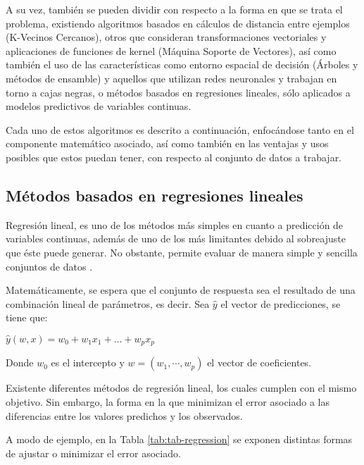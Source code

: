 A su vez, también se pueden dividir con respecto a la forma en que se trata el problema, existiendo algoritmos basados en cálculos de distancia entre ejemplos (K-Vecinos Cercanos), otros que consideran transformaciones vectoriales y aplicaciones de funciones de kernel (Máquina Soporte de Vectores), así como también el uso de las características como entorno espacial de decisión (Árboles y métodos de ensamble) y aquellos que utilizan redes neuronales y trabajan en torno a cajas negras, o métodos basados en regresiones lineales, sólo aplicados a modelos predictivos de variables continuas.

Cada uno de estos algoritmos es descrito a continuación, enfocándose tanto en el componente matemático asociado, así como también en las ventajas y usos posibles que estos puedan tener, con respecto al conjunto de datos a trabajar.

\subsection{Métodos basados en regresiones lineales}

Regresión lineal, es uno de los métodos más simples en cuanto a predicción de variables continuas, además de uno de los más limitantes debido al sobreajuste que éste puede generar. No obstante, permite evaluar de manera simple y sencilla conjuntos de datos \cite{graybill1976theory}. 

Matemáticamente, se espera que el conjunto de respuesta sea el resultado de una combinación lineal de parámetros, es decir. Sea $\hat{y}$ el vector de predicciones, se tiene que:

\begin{center}
	$\hat{y}(w, x) = w_0 + w_1 x_1 + ... + w_p x_p$
\end{center}

Donde $w_0$ es el intercepto y $w = (w_1,\cdots, w_p)$ el vector de coeficientes.

Existente diferentes métodos de regresión lineal, los cuales cumplen con el mismo objetivo. Sin embargo, la forma en la que minimizan el error asociado a las diferencias entre los valores predichos y los observados.

A modo de ejemplo, en la Tabla \ref{tab:tab-regression} se exponen distintas formas de ajustar o minimizar el error asociado.

